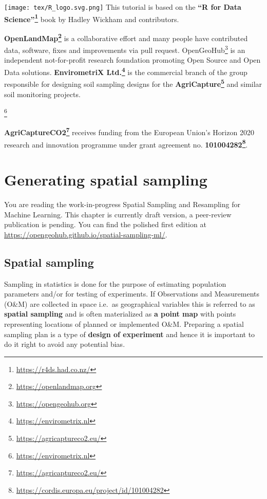 \documentclass[
  graybox,natbib,nospthms]{svmono}
\renewcommand{\href}[2]{#2 (\url{#1})}
\renewcommand{\href}[2]{#2\footnote{\url{#1}}}
\begin{document}
\texttt{[image: tex/R\_logo.svg.png]} This tutorial is based on the \textbf{\href{https://r4ds.had.co.nz/}{``R for Data Science''}} book by Hadley Wickham and contributors.

\textbf{\href{https://openlandmap.org}{OpenLandMap}} is a collaborative effort and many people
have contributed data, software, fixes and improvements via pull request. \href{https://opengeohub.org}{OpenGeoHub}
is an independent not-for-profit research foundation promoting Open Source and Open Data solutions.
\textbf{\href{https://envirometrix.nl}{EnvirometriX Ltd.}} is the commercial branch of the group
responsible for designing soil sampling designs for the \textbf{\href{https://agricaptureco2.eu/}{AgriCapture}} and similar soil monitoring projects.

\href{https://envirometrix.nl}{}

\textbf{\href{https://agricaptureco2.eu/}{AgriCaptureCO2}} receives funding from the European Union's Horizon 2020 research and innovation programme under grant agreement no. \textbf{\href{https://cordis.europa.eu/project/id/101004282}{101004282}}.

\hypertarget{generating-spatial-sampling}{%
\chapter{Generating spatial sampling}\label{generating-spatial-sampling}}

You are reading the work-in-progress Spatial Sampling and Resampling for Machine Learning. This chapter is currently draft version, a peer-review publication is pending. You can find the polished first edition at \url{https://opengeohub.github.io/spatial-sampling-ml/}.

\hypertarget{spatial-sampling}{%
\section{Spatial sampling}\label{spatial-sampling}}

Sampling in statistics is done for the purpose of estimating population
parameters and/or for testing of experiments. If Observations and
Measurements (O\&M) are collected in space i.e.~as geographical variables
this is referred to as \textbf{spatial sampling} and is often materialized as
\textbf{a point map} with points representing locations of planned or
implemented O\&M. Preparing a spatial sampling plan is a type of \textbf{design
of experiment} and hence it is important to do it right to avoid any
potential bias.
\end{document}

